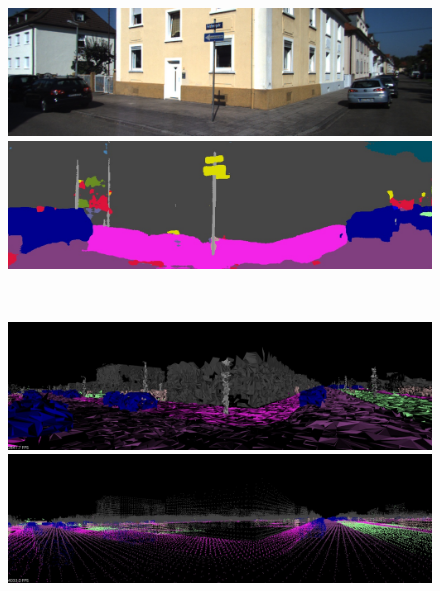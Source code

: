 \begin{figure}[htbp]
 \begin{minipage}[b]{0.50\hsize}
 \begin{center}
  \includegraphics[keepaspectratio, scale=0.18]{./picture/bgrimage/bgrimage2.jpg}
  \end{center}
 \end{minipage}
 \begin{minipage}[b]{0.5\hsize}
 \begin{center}
  \includegraphics[keepaspectratio, scale=0.18]{./picture/segimage/image2.jpg}
  \end{center}
 \end{minipage} \\
 \begin{minipage}[b]{0.50\hsize}
 \begin{center}
  \includegraphics[keepaspectratio, scale=0.18]{./picture/mesh_map_image/image2.jpg}
  \end{center}
 \end{minipage}
 \begin{minipage}[b]{0.50\hsize}
 \begin{center}
  \includegraphics[keepaspectratio, scale=0.18]{./picture/point_map_image/image2.jpg}

\end{center}
\end{minipage}
\end{figure}
